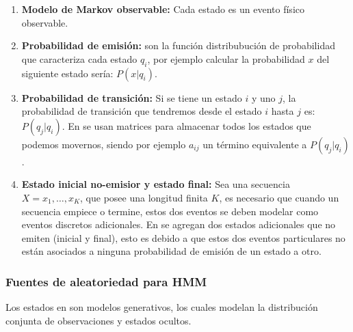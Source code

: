 \begin{enumerate}

	\item \textbf{Modelo de Markov observable:} Cada estado es un evento físico observable.

	\item \textbf{Probabilidad de emisión:} son la  función distribubución de probabilidad que caracteriza cada estado $q_{i}$, por ejemplo calcular la probabilidad $x$ del siguiente estado sería: $P( x | q_{i})$.

	\item \textbf{Probabilidad de transición:} Si se tiene un estado $i$ y uno $j$, la probabilidad de transición que tendremos  desde el estado $i$ hasta $j$  es: $P(q_{j} | q_{i}  )$. En \HMM se usan matrices para almacenar todos los estados que podemos movernos, siendo por ejemplo $a_{ij}$ un término equivalente a $ P(q_{j} | q_{i}  )$.




	\item \textbf{Estado inicial no-emisior y estado final:} Sea una secuencia $X = {x_1,\dots ,x_K} $, que posee una longitud finita $K$, es necesario que cuando un secuencia empiece o termine, estos dos eventos se deben modelar como eventos discretos adicionales. En \HMM se agregan dos estados adicionales que no emiten (inicial y final), esto es debido a que estos dos eventos particulares no están asociados a ninguna probabilidad de emisión de un estado a otro.



\end{enumerate}





\subsubsection{Fuentes de aleatoriedad para HMM}

Los estados en \HMM son modelos generativos, los cuales modelan la distribución conjunta de  observaciones y estados ocultos.

